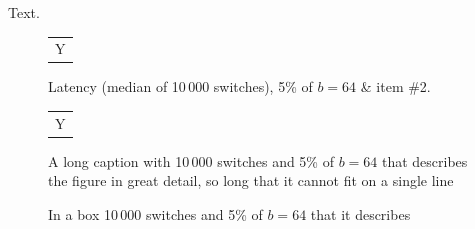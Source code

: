 \documentclass{article}
\begin{document}
\listoffigures
Text.
\begin{figure}[h]
\centering
\begin{tabular}{c}Y\end{tabular}
\caption{Latency (median of 10\,000 switches), 5\% of $b=64$ \& item \#2.}
\end{figure}
\begin{figure}[h]
\centering
\begin{tabular}{c}Y\end{tabular}
\caption{A long caption with 10\,000 switches and 5\% of $b=64$ that describes the figure in great detail, so long that it cannot fit on a single line}
\end{figure}
\begin{figure}[h]
\begin{minipage}{5cm}
\caption{In a box 10\,000 switches and 5\% of $b=64$ that it describes}
\end{minipage}
\end{figure}
\end{document}
